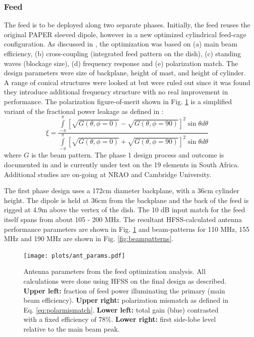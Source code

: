 \documentclass[preprint,11pt]{aastex}
\newcommand{\integral}{\int\limits}
\begin{document}
\subsubsection{Feed}
\label{sec:feed}
The feed is to be deployed along two separate phases.  Initially, the feed reuses the original PAPER sleeved dipole, however in a new optimized cylindrical feed-cage configuration.  As discussed in \cite{feedmemo}, the optimization was based on (a) main beam efficiency, (b) cross-coupling (integrated feed pattern on the dish), (c) standing waves (blockage size), (d) frequency response and (e) polarization match.  The design parameters were size of backplane, height of mast, and height of cylinder.  A range of conical structures were looked at but were ruled out since it was found they introduce additional frequency structure with no real improvement in performance.  The polarization figure-of-merit shown in Fig. \ref{fig:ant_params} is a simplified variant of the fractional power leakage as defined in \cite{Moore_et_al2015}:
\begin{equation}
\xi = \frac{\integral_{-\pi}^{\pi}\left[\sqrt{G(\theta,\phi=0)} - \sqrt{G(\theta,\phi=90)}\right]^2\sin\theta d\theta}
               {\integral_{-\pi}^{\pi}\left[\sqrt{G(\theta,\phi=0)} + \sqrt{G(\theta,\phi=90)}\right]^2\sin\theta d\theta}
     \label{eq:polarmismatch}
\end{equation}
where $G$ is the beam pattern.
The phase 1 design process and outcome is documented in  \cite{feedmemo} and is currently under test on the 19 elements in South Africa. Additional studies are on-going at NRAO and Cambridge University.

The first phase design uses a 172cm diameter backplane, with a 36cm cylinder height.  The dipole is held at 36cm from the backplane and the back of the feed is rigged at 4.9m above the vertex of the dish.  The 10 dB input match for the feed itself spans from about 105 - 200 MHz.  The resultant HFSS-calculated antenna performance parameters are shown in Fig. \ref{fig:ant_params} and beam-patterns for 110 MHz, 155 MHz and 190 MHz are shown in Fig. \ref{fig:beampatterns}.

\begin{figure}[h!]
\centerline{
\texttt{[image: plots/ant\_params.pdf]}
}
\caption{\small Antenna parameters from the feed optimization analysis.  All calculations were done using HFSS on the final design as described.  {\bf Upper left:}  fraction of feed power illuminating the primary (main beam efficiency).  {\bf Upper right:}  polarization mismatch as defined in Eq.  \ref{eq:polarmismatch}.  {\bf Lower left:}  total gain (blue) contrasted with a fixed efficiency of 78\%.  {\bf Lower right:}  first side-lobe level relative to the main beam peak.}
\label{fig:ant_params}
\end{figure}
\end{document}
